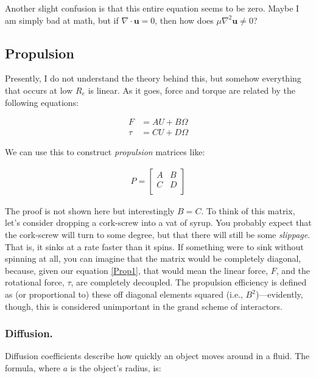 Another slight confusion is that this entire equation seems to be zero. Maybe I am simply bad at math, but if $\nabla \cdot \mathbf{u} = 0$, then how does $\mu \nabla^2\mathbf{u} \neq 0$?

\subsection{Propulsion}


Presently, I do not understand the theory behind this, but somehow everything that occurs at low $R_e$ is linear. As it goes, force and torque are related by the following equations: 

\begin{equation} \label{Prop1}
\begin{split}
F &= AU + B\Omega \\
\tau &= CU + D\Omega
\end{split}
\end{equation}

We can use this to construct \textit{propulsion} matrices like: 

\begin{align}
P = 
\begin{bmatrix} 
A & B  \\
C & D  \\
\end{bmatrix}
\end{align}

The proof is not shown here but interestingly $B = C$. To think of this matrix, let's consider dropping a cork-screw into a vat of syrup. You probably expect that the cork-screw will turn to some degree, but that there will still be some \textit{slippage}. That is, it sinks at a rate faster than it spins. If something were to sink without spinning at all, you can imagine that the matrix would be completely diagonal, because, given our equation \ref{Prop1}, that would mean the linear force, $F$, and the rotational force, $\tau$, are completely decoupled. The propulsion efficiency is defined as (or proportional to) these off diagonal elements squared (i.e., $B^2$)---evidently, though, this is considered unimportant in the grand scheme of interactors. 

\subsubsection{Diffusion.}

Diffusion coefficients describe how quickly an object moves around in a fluid. The formula, where $a$ is the object's radius, is: 


